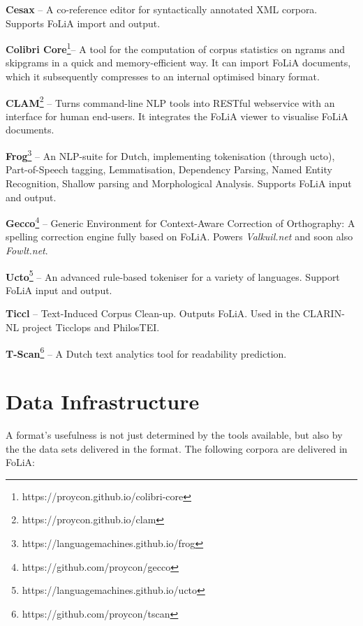 \begin{tabular}
\item \textbf{Cesax} -- A co-reference editor for syntactically annotated XML corpora.
    Supports FoLiA import and output.\cite{CESAX} 
\item \textbf{Colibri Core}\footnote{https://proycon.github.io/colibri-core}-- A tool for the computation
    of corpus statistics on ngrams and skipgrams in a quick and
    memory-efficient way. It can import FoLiA documents, which it subsequently
    compresses to an internal optimised binary format.
\item \textbf{CLAM}\footnote{https://proycon.github.io/clam} -- Turns command-line NLP tools into RESTful webservice with an
    interface for human end-users. It integrates the FoLiA viewer to visualise
    FoLiA documents.\cite{CLAM}
\item \textbf{Frog}\footnote{https://languagemachines.github.io/frog} -- An NLP-suite for Dutch, implementing tokenisation (through
    ucto), Part-of-Speech tagging, Lemmatisation, Dependency Parsing, Named
    Entity Recognition, Shallow parsing and Morphological Analysis. Supports
    FoLiA input and output.
\item \textbf{Gecco}\footnote{https://github.com/proycon/gecco}  -- Generic Environment for Context-Aware Correction
    of Orthography: A spelling correction engine fully based on FoLiA. Powers
    \emph{Valkuil.net} and soon also \emph{Fowlt.net}.
\item \textbf{Ucto}\footnote{https://languagemachines.github.io/ucto} -- An advanced rule-based tokeniser for a variety of
    languages. Support FoLiA
    input and output.\cite{UCTO}
\item \textbf{Ticcl} -- Text-Induced Corpus Clean-up. Outputs FoLiA. Used in the
    CLARIN-NL project Ticclops and PhilosTEI.\cite{TICCL}
\item \textbf{T-Scan}\footnote{https://github.com/proycon/tscan} -- A Dutch text analytics tool for readability
    prediction.\cite{TSCAN}
\end{tabular}


\section{Data Infrastructure}

A format's usefulness is not just determined by the tools
available, but also by the the data sets delivered in the format.
The following corpora are delivered in FoLiA:

